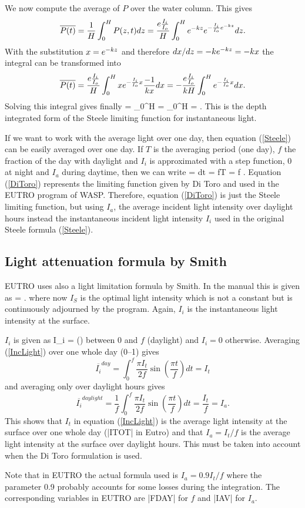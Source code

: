 We now compute the average of $P$ over the water column.
This gives
\[
\overline{P(t)} = \frac{1}{H} \int_0^H P(z,t) dz = 
	\frac{e \frac{I_i}{I_o}}{H} \int_0^H e^{-kz} e^{-\frac{I_i}{I_o}e^{-kz}} dz.
\]
With the substitution $x = e^{-kz}$ and therefore 
$dx/dz = -k e^{-kz} = -kx$ the integral can be transformed into
\[
\overline{P(t)} = \frac{e \frac{I_i}{I_o}}{H} \int_0^H x e^{-\frac{I_i}{I_o} x} \frac{-1}{kx} dx
	= - \frac{e \frac{I_i}{I_o}}{kH} \int_0^H e^{-\frac{I_i}{I_o} x} dx.
\]
Solving this integral gives finally
\beq \label{Steele}
\PO =  _0^H
	=  _0^H
	=  .
\eeq
This is the depth integrated form of the Steele limiting function
for instantaneous light.

If we want to work with the average light over one day, then
equation (\ref{Steele}) can be easily averaged over one day.
If $T$ is the averaging period (one day), $f$ the fraction of the day with
daylight and $I_i$ is approximated with a step function, 0 at night
and $I_a$ during daytime, then we can write
\beq \label{DiToro}
\POO =  \int \PO dt 
	=  fT  
	=  f .
\eeq
Equation (\ref{DiToro}) represents the limiting function given by Di Toro
and used in the EUTRO program of WASP. Therefore, equation (\ref{DiToro})
is just the Steele limiting function, but using $I_a$, the average 
incident light intensity over daylight hours instead the 
instantaneous incident light intensity $I_i$ used in the original
Steele formula (\ref{Steele}).


\subsection{Light attenuation formula by Smith}

EUTRO uses also a light limitation formula by Smith. In the manual
this is given as 
\beq \label{Smith}
\PO =  .
\eeq
where now $I_S$ is the optimal light intensity which is not a constant but is
continuously adjourned by the program. Again, $I_i$ is
the instantaneous light intensity at the surface.

$I_i$ is given as
\beq \label{IncLight}
I_i =  \sin ()
\eeq
between 0 and $f$ (daylight) and $I_i=0$ otherwise.
Averaging (\ref{IncLight}) over one whole day (0--1) gives
\[
\overline{I_i}^{day} = \int_0^f \frac{\pi I_t}{2f} \sin (\frac{\pi t}{f}) dt
	= I_t
\]
and averaging only over daylight hours gives
\[
\overline{I_i}^{daylight} = 
	\frac{1}{f} \int_0^f \frac{\pi I_t}{2f} \sin (\frac{\pi t}{f}) dt
	= \frac{I_t}{f} = I_a.
\]
This shows that $I_t$ in equation (\ref{IncLight}) is the average
light intensity at the surface over one whole day (|ITOT| in Eutro)
and that $I_a = I_t/f$ is the average light intensity at the surface
over daylight hours. This must be taken into account when the
Di Toro formulation is used.

Note that in EUTRO the actual formula used is 
$I_a = 0.9 I_t/f$ where the parameter 0.9 probably accounts
for some losses during the integration. The corresponding
variables in EUTRO are |FDAY| for $f$ and |IAV| for $I_a$.




%
